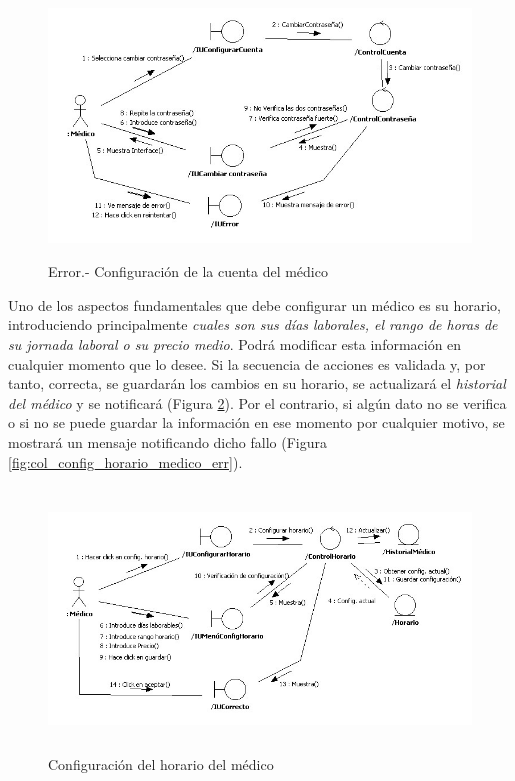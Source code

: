 \documentclass[a4paper,oneside,11pt]{book}
\begin{document}
			\begin{figure}[H]
			  \centering
			    \includegraphics[height=7cm, width=16cm]{img/jpg/colaboraciones/5_ConfiguracionCuentaMedicoError.jpg}
			  \caption{Error.- Configuración de la cuenta del médico}
			  \label{fig:col_config_cuenta_medico_err}
			\end{figure}
			
			Uno de los aspectos fundamentales que debe configurar un médico es su horario, introduciendo principalmente \textit{cuales son sus días laborales, el rango de horas de su jornada laboral o su precio medio}. Podrá modificar esta información en cualquier momento que lo desee. Si la secuencia de acciones es validada y, por tanto, correcta, se guardarán los cambios en su horario, se actualizará el \textit{historial del médico} y se notificará (Figura \ref{fig:col_config_horario_medico}). Por el contrario, si algún dato no se verifica o si no se puede guardar la información en ese momento por cualquier motivo, se mostrará un mensaje notificando dicho fallo (Figura \ref{fig:col_config_horario_medico_err}).
			
			\begin{figure}[H]
			  \centering
			    \includegraphics[width=16cm, height=7cm]{img/jpg/colaboraciones/6_ConfiguracionHorarioMedico.jpg}
			  \caption{Configuración del horario del médico}
			  \label{fig:col_config_horario_medico}
			\end{figure}
			
\end{document}
